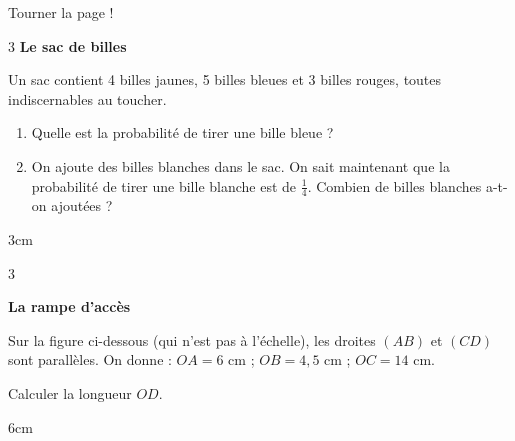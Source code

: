 \documentclass[a4paper]{book}
\begin{document}
{    \vfill
    \hfill Tourner la page !


\newpage
    
    
    \begin{exerciceNote}{3}
        \textbf{Le sac de billes}
        
        Un sac contient 4 billes jaunes, 5 billes bleues et 3 billes rouges, toutes indiscernables au toucher.
        \begin{enumerate}
            \item Quelle est la probabilité de tirer une bille bleue ?
            \item On ajoute des billes blanches dans le sac. On sait maintenant que la probabilité de tirer une bille blanche est de $\frac{1}{4}$. Combien de billes blanches a-t-on ajoutées ?
        \end{enumerate}
        \begin{ZoneReponse}{3cm}
        \end{ZoneReponse}
    \end{exerciceNote}

    
    \begin{exerciceNote}{3}
        \begin{minipage}{0.4\linewidth}
            \textbf{La rampe d'accès}
            
            Sur la figure ci-dessous (qui n'est pas à l'échelle), les droites $(AB)$ et $(CD)$ sont parallèles.
            On donne : $OA = 6$ cm ; $OB = 4,5$ cm ; $OC = 14$ cm.

            \bigskip

            Calculer la longueur $OD$.
        \end{minipage}
        \hfill
        \begin{minipage}{0.39\linewidth}
            \begin{center}
            \end{center}
        \end{minipage}
                
        \begin{ZoneReponse}{6cm}
        \end{ZoneReponse}
    \end{exerciceNote}

}
\end{document}
